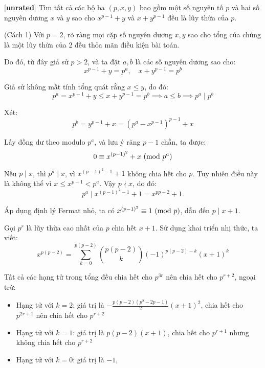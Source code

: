 \documentclass[../02-modular-arithmetic-b.tex]{subfiles}
\begin{document}
\begin{example*}\label{example:IND-2015-TST3-P2}[\textbf{unrated}]\footnotemark
	Tìm tất cả các bộ ba \( (p, x, y) \) bao gồm một số nguyên tố \( p \) và hai số nguyên dương \( x \) và \( y \)
	sao cho \( x^{p-1} + y \) và \( x + y^{p-1} \) đều là lũy thừa của \( p \).
\end{example*}

\begin{soln}(Cách 1)
	Với \( p = 2 \), rõ ràng mọi cặp số nguyên dương \( x, y \) sao cho tổng của chúng là một lũy thừa của 2 đều thỏa mãn điều kiện bài toán.

	Do đó, từ đây giả sử \( p > 2 \), và ta đặt \( a, b \) là các số nguyên dương sao cho:
	\[
		x^{p-1} + y = p^a,\quad x + y^{p-1} = p^b
	\]
	
	Giả sử không mất tính tổng quát rằng \( x \le y \), do đó:
	\[
		p^a = x^{p-1} + y \le x + y^{p-1} = p^b \implies a \le b \implies p^a \mid p^b
	\]
	
	Xét:
	\[
		p^b = y^{p-1} + x = (p^a - x^{p-1})^{p-1} + x
	\]
	
	Lấy đồng dư theo modulo \( p^a \), và lưu ý răng $p-1$ chẵn, ta được:
	\[
		0 \equiv x^{(p-1)^2} + x \ (\mathrm{mod}\ p^a)
	\]
	
	Nếu \( p \mid x \), thì \( p^a \mid x \), vì $x^{(p-1)^2-1} + 1$ không chia hết cho $p$.
	Tuy nhiên điều này là không thể vì \( x \le x^{p-1} < p^a \). Vậy \( p \nmid x \), do đó:
	\[
		p^a \mid x^{(p-1)^2-1} + 1 = x^{p{p-2}} + 1.
	\]
	
	Áp dụng định lý Fermat nhỏ, ta có \( x^{(p-1)^2} \equiv 1 \ (\mathrm{mod}\ p) \), dẫn đến \( p \mid x + 1 \).
	
	Gọi \( p^r \) là lũy thừa cao nhất của \( p \) chia hết \( x + 1 \). Sử dụng khai triển nhị thức, ta viết:
	\[
		x^{p(p - 2)} = \sum_{k=0}^{p(p - 2)} \binom{p(p - 2)}{k} (-1)^{p(p - 2)-k}(x+1)^k
	\]
	
	Tất cả các hạng tử trong tổng đều chia hết cho $p^{3r}$ nên chia hết cho \( p^{r+2} \), ngoại trừ:
    \begin{itemize}[topsep=0pt, partopsep=0pt, itemsep=0pt]
        \item Hạng tử với \( k = 2 \): giá trị là $-\frac{p(p-2)(p^2-2p-1)}{2}(x+1)^2$, chia hết cho \( p^{2r + 1} \) nên chia hết cho \( p^{r + 2} \)
        \item Hạng tử với \( k = 1 \): giá trị là $p(p-2)(x+1)$, chia hết cho \( p^{r + 1} \) nhưng không chia hết cho \( p^{r + 2} \)
        \item Hạng tử với \( k = 0 \): giá trị là \( -1 \), 
    \end{itemize}
	

\end{soln}
\end{document}
